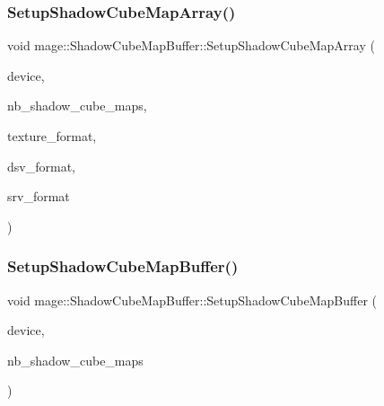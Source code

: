 \subsubsection{\texorpdfstring{Setup\+Shadow\+Cube\+Map\+Array()}{SetupShadowCubeMapArray()}}
{\footnotesize\ttfamily void mage\+::\+Shadow\+Cube\+Map\+Buffer\+::\+Setup\+Shadow\+Cube\+Map\+Array (\begin{DoxyParamCaption}\item[{I\+D3\+D11\+Device5 $\ast$}]{device,  }\item[{size\+\_\+t}]{nb\+\_\+shadow\+\_\+cube\+\_\+maps,  }\item[{D\+X\+G\+I\+\_\+\+F\+O\+R\+M\+AT}]{texture\+\_\+format,  }\item[{D\+X\+G\+I\+\_\+\+F\+O\+R\+M\+AT}]{dsv\+\_\+format,  }\item[{D\+X\+G\+I\+\_\+\+F\+O\+R\+M\+AT}]{srv\+\_\+format }\end{DoxyParamCaption})\hspace{0.3cm}{\ttfamily [private]}}

\hypertarget{structmage_1_1_shadow_cube_map_buffer_a0ac976b6d2a8730bce826fa7ffa502db}{}\label{structmage_1_1_shadow_cube_map_buffer_a0ac976b6d2a8730bce826fa7ffa502db} 
\subsubsection{\texorpdfstring{Setup\+Shadow\+Cube\+Map\+Buffer()}{SetupShadowCubeMapBuffer()}}
{\footnotesize\ttfamily void mage\+::\+Shadow\+Cube\+Map\+Buffer\+::\+Setup\+Shadow\+Cube\+Map\+Buffer (\begin{DoxyParamCaption}\item[{I\+D3\+D11\+Device5 $\ast$}]{device,  }\item[{size\+\_\+t}]{nb\+\_\+shadow\+\_\+cube\+\_\+maps }\end{DoxyParamCaption})\hspace{0.3cm}{\ttfamily [private]}}

\hypertarget{structmage_1_1_shadow_cube_map_buffer_a612f25e151e575a7266b41ddb6a072cf}{}\label{structmage_1_1_shadow_cube_map_buffer_a612f25e151e575a7266b41ddb6a072cf} 
